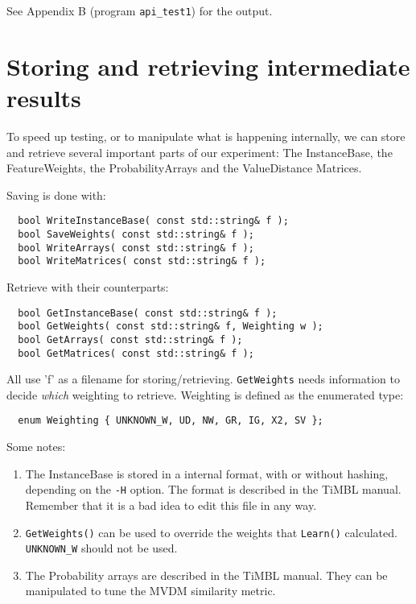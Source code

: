 \documentclass{report}
\begin{document}
See Appendix B (program {\tt api\_test1}) for the output.

\section{Storing and retrieving intermediate results}

To speed up testing, or to manipulate what is happening internally, we
can store and retrieve several important parts of our experiment: The
InstanceBase, the FeatureWeights, the ProbabilityArrays and the ValueDistance Matrices.

Saving is done with:

\begin{footnotesize}
\begin{verbatim}
  bool WriteInstanceBase( const std::string& f );
  bool SaveWeights( const std::string& f );
  bool WriteArrays( const std::string& f );
  bool WriteMatrices( const std::string& f );
\end{verbatim}
\end{footnotesize}

Retrieve with their counterparts:

\begin{footnotesize}
\begin{verbatim}
  bool GetInstanceBase( const std::string& f );
  bool GetWeights( const std::string& f, Weighting w );
  bool GetArrays( const std::string& f );
  bool GetMatrices( const std::string& f );
\end{verbatim}
\end{footnotesize}

All use 'f' as a filename for storing/retrieving. {\tt GetWeights} needs
information to decide {\em which}\/ weighting to retrieve.
Weighting is defined as the enumerated type:

\begin{footnotesize}
\begin{verbatim}
  enum Weighting { UNKNOWN_W, UD, NW, GR, IG, X2, SV };
\end{verbatim}
\end{footnotesize}

Some notes:

\begin{enumerate}
\item The InstanceBase is stored in a internal format, with or without
hashing, depending on the {\tt -H} option. The format is described in the
TiMBL manual. Remember that it is a bad idea to edit this file in any way.
\item {\tt GetWeights()} can be used to override the weights that
{\tt Learn()} calculated. {\tt UNKNOWN\_W} should not be used.
\item The Probability arrays are described in the TiMBL manual. They can be
manipulated to tune the MVDM similarity metric.
\end{enumerate}
\end{document}
